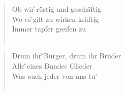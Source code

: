 \documentclass[9pt,a4paper,oneside, onecolumn]{article}
\begin{document}
\begin{multicols}{2}
\begin{verse}
Ob wir \G{}rüstig und geschäftig\\
Wo es \G{}gilt zu wirken kräftig\\
Immer \Am{}tapfer greifen zu\\
\\
\end{verse}

\begin{verse}
Drum ihr \G{}Bürger, drum ihr Brüder\\
Alle \G{}eines Bundes Glieder\\
Was auch \Am{}jeder von uns tu'\\
\\
\end{verse}


\end{multicols}
\end{document}
